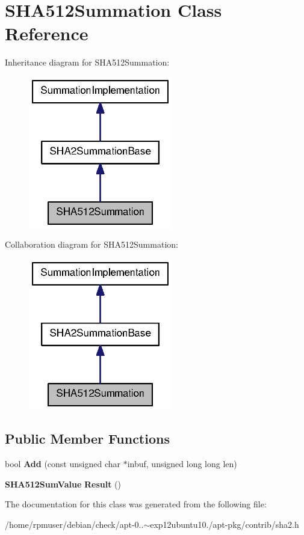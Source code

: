 \section{\-S\-H\-A512\-Summation \-Class \-Reference}
\label{classSHA512Summation}


\-Inheritance diagram for \-S\-H\-A512\-Summation\-:
\nopagebreak
\begin{figure}[H]
\begin{center}
\leavevmode
\includegraphics[width=178pt]{classSHA512Summation__inherit__graph}
\end{center}
\end{figure}


\-Collaboration diagram for \-S\-H\-A512\-Summation\-:
\nopagebreak
\begin{figure}[H]
\begin{center}
\leavevmode
\includegraphics[width=178pt]{classSHA512Summation__coll__graph}
\end{center}
\end{figure}
\subsection*{\-Public \-Member \-Functions}
\begin{DoxyCompactItemize}
\item 
bool {\bfseries \-Add} (const unsigned char $\ast$inbuf, unsigned long long len)\label{classSHA512Summation_aaf9245e21054d9eba3299d4cfd61e0e4}

\item 
{\bf \-S\-H\-A512\-Sum\-Value} {\bfseries \-Result} ()\label{classSHA512Summation_a6ecbbad19ebbd2e479d44d4906165df4}

\end{DoxyCompactItemize}


\-The documentation for this class was generated from the following file\-:\begin{DoxyCompactItemize}
\item 
/home/rpmuser/debian/check/apt-\/0..$\sim$exp12ubuntu10./apt-\/pkg/contrib/sha2.\-h\end{DoxyCompactItemize}
